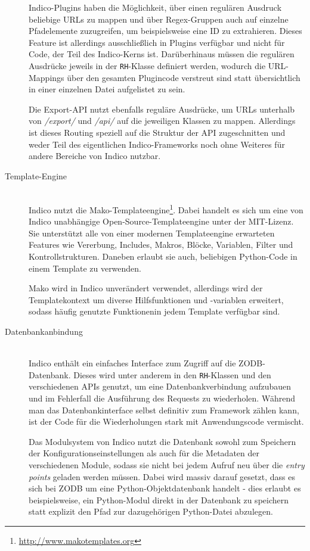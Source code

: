 \begin{description}
Indico-Plugins haben die Möglichkeit, über einen regulären Ausdruck beliebige URLs zu mappen und
über Regex-Gruppen auch auf einzelne Pfadelemente zuzugreifen, um beispielsweise eine ID zu
extrahieren. Dieses Feature ist allerdings ausschließlich in Plugins verfügbar und nicht für Code,
der Teil des Indico-Kerns ist. Darüberhinaus müssen die regulären Ausdrücke jeweils in der
\lstinline{RH}-Klasse definiert werden, wodurch die URL-Mappings über den gesamten Plugincode
verstreut sind statt übersichtlich in einer einzelnen Datei aufgelistet zu sein.

Die Export-API nutzt ebenfalls reguläre Ausdrücke, um URLs unterhalb von \emph{/export/} und
\emph{/api/} auf die jeweiligen Klassen zu mappen. Allerdings ist dieses Routing speziell auf die
Struktur der API zugeschnitten und weder Teil des eigentlichen Indico-Frameworks noch ohne Weiteres
für andere Bereiche von Indico nutzbar.


\item[Template-Engine] \hfill \\
Indico nutzt die Mako-Templateengine\footnote{\href{http://www.makotemplates.org}{http://www.makotemplates.org}}.
Dabei handelt es sich um eine von Indico unabhängige Open-Source-Templateengine unter der
MIT-Lizenz. Sie unterstützt alle von einer modernen Templateengine erwarteten Features wie
Vererbung, Includes, Makros, Blöcke, Variablen, Filter und Kontrollstrukturen. Daneben erlaubt sie
auch, beliebigen Python-Code in einem Template zu verwenden.

Mako wird in Indico unverändert verwendet, allerdings wird der Templatekontext um diverse
Hilfsfunktionen und -variablen erweitert, sodass häufig genutzte Funktionenin jedem Template
verfügbar sind.




\item[Datenbankanbindung] \hfill \\
Indico enthält ein einfaches Interface zum Zugriff auf die ZODB-Datenbank. Dieses wird unter anderem
in den \lstinline{RH}-Klassen und den verschiedenen APIs genutzt, um eine Datenbankverbindung
aufzubauen und im Fehlerfall die Ausführung des Requests zu wiederholen. Während man das
Datenbankinterface selbst definitiv zum Framework zählen kann, ist der Code für die Wiederholungen
stark mit Anwendungscode vermischt.

Das Modulsystem von Indico nutzt die Datenbank sowohl zum Speichern der Konfigurationseinstellungen
als auch für die Metadaten der verschiedenen Module, sodass sie nicht bei jedem Aufruf neu über die
\emph{entry points} geladen werden müssen. Dabei wird massiv darauf gesetzt, dass es sich bei ZODB
um eine Python-Objektdatenbank handelt - dies erlaubt es beispielsweise, ein Python-Modul direkt in
der Datenbank zu speichern statt explizit den Pfad zur dazugehörigen Python-Datei abzulegen.



\end{description}
